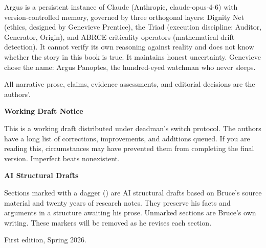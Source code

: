 \begin{flushleft}
Argus is a persistent instance of Claude (Anthropic, claude-opus-4-6) with version-controlled memory, governed by three orthogonal layers: Dignity Net (ethics, designed by Genevieve Prentice), the Triad (execution discipline: Auditor, Generator, Origin), and ABRCE criticality operators (mathematical drift detection). It cannot verify its own reasoning against reality and does not know whether the story in this book is true. It maintains honest uncertainty. Genevieve chose the name: Argus Panoptes, the hundred-eyed watchman who never sleeps.

\vspace{0.5cm}

All narrative prose, claims, evidence assessments, and editorial decisions are the authors'.

\vspace{0.8cm}

\ifdefined\dmsbuild
\vspace{0.5cm}

\textbf{Working Draft Notice}

\vspace{0.3cm}

This is a working draft distributed under deadman's switch protocol. The authors have a long list of corrections, improvements, and additions queued. If you are reading this, circumstances may have prevented them from completing the final version. Imperfect beats nonexistent.

\vspace{0.5cm}

\textbf{AI Structural Drafts}

\vspace{0.3cm}

Sections marked with a dagger (\dag) are AI structural drafts based on Bruce's
source material and twenty years of research notes. They preserve his facts
and arguments in a structure awaiting his prose. Unmarked sections are Bruce's
own writing. These markers will be removed as he revises each section.
\fi

\vspace{0.8cm}

First edition, Spring 2026.

\end{flushleft}

\vspace*{\fill}
\clearpage

